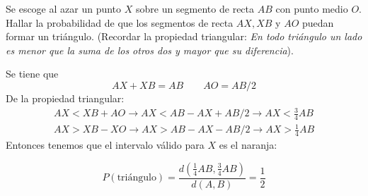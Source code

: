 \item Se escoge al azar un punto $X$ sobre un segmento de recta $AB$ con punto medio $O$. Hallar la probabilidad de que los segmentos de recta $AX,XB$ y $AO$ puedan formar un triángulo. (Recordar la propiedad triangular: \textit{En todo triángulo un lado es menor que la suma de los otros dos y mayor que su diferencia}).
    \begin{center}
    \end{center}
    Se tiene que\[AX+XB=AB\qquad AO=AB/2\]
    De la propiedad triangular:\begin{align*}
        AX<XB+AO\to AX<AB-AX+AB/2\to AX<\tfrac{3}{4}AB\\
        AX>XB-XO\to AX>AB-AX-AB/2\to AX>\tfrac{1}{4}AB
    \end{align*}
    Entonces tenemos que el intervalo válido para $X$ es el naranja:
    \begin{center}
    \end{center}
    \[P(\text{triángulo})=\frac{d(\tfrac{1}{4}AB,\tfrac{3}{4}AB)}{d(A,B)}=\frac{1}{2}\]